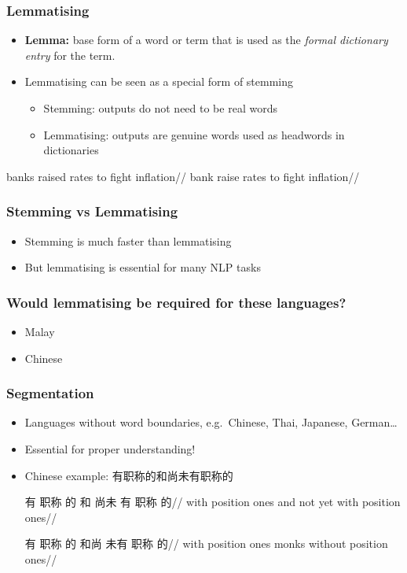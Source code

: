 \begin{frame}[allowframebreaks]
\frametitle{Lemmatising}

\begin{itemize}
\item \textbf{Lemma:} base form of a word or term that is used as the \emph{formal dictionary entry} for the term.
\item Lemmatising can be seen as a special form of stemming
	\begin{itemize}
	\item Stemming: outputs do not need to be real words
	\item Lemmatising: outputs are genuine words used as headwords in dictionaries
	\end{itemize}
\end{itemize}

\ex
\begingl
\gla {} banks raised rates to fight inflation//
\glb {} bank raise rates to fight inflation//
\endgl
\xe
\end{frame}


\begin{frame}
\frametitle{Stemming vs Lemmatising}
    
\begin{itemize}
\item Stemming is much faster than lemmatising
\item But lemmatising is essential for many NLP tasks
\end{itemize}

\end{frame}

\begin{frame}
\frametitle{Would lemmatising be required for these languages?}

\begin{itemize}
\item Malay
\item Chinese
\end{itemize}

\end{frame}


\begin{frame}
\frametitle{Segmentation}
\begin{itemize}[<+->]
\item Languages without word boundaries, e.g.~Chinese, Thai, Japanese, German\ldots
\item Essential for proper understanding!
\item Chinese example: {有职称的和尚未有职称的}

\ex
\begingl
\gla 有 职称 的 和 尚未 有 职称 的//
\glb with position ones and {not yet} with position ones//
\endgl
\xe

\ex
\begingl
\gla 有 职称 的 \alert{和尚} 未有 职称 的//
\glb with position ones \alert{monks} without position ones//
\endgl
\xe

\end{itemize}

\end{frame}


